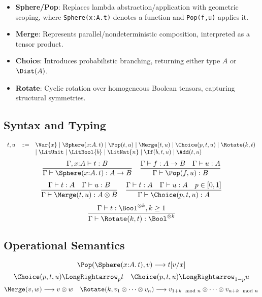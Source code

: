 \documentclass{article}
\begin{document}
\begin{itemize}
    \item \textbf{Sphere/Pop}: Replaces lambda abstraction/application with geometric scoping, where \texttt{Sphere(x:A.t)} denotes a function and \texttt{Pop(f,u)} applies it.
    \item \textbf{Merge}: Represents parallel/nondeterministic composition, interpreted as a tensor product.
    \item \textbf{Choice}: Introduces probabilistic branching, returning either type $A$ or $\Dist(A)$.
    \item \textbf{Rotate}: Cyclic rotation over homogeneous Boolean tensors, capturing structural symmetries.
\end{itemize}

\subsection{Syntax and Typing}
\[
\begin{array}{rcl}
t,u &::=& \Var{x} \mid \Sphere(x{:}A.\,t) \mid \Pop(t,u) \mid \Merge(t,u) \mid \Choice(p,t,u) \mid \Rotate(k,t) \\
    && \mid \LitUnit \mid \LitBool{b} \mid \LitNat{n} \mid \If(b,t,u) \mid \Add(t,u)
\end{array}
\]
\[
\frac{\Gamma, x{:}A \vdash t : B}{\Gamma \vdash \Sphere(x{:}A.\,t) : A \to B} \quad
\frac{\Gamma \vdash f : A \to B \quad \Gamma \vdash u : A}{\Gamma \vdash \Pop(f,u) : B}
\]
\[
\frac{\Gamma \vdash t : A \quad \Gamma \vdash u : B}{\Gamma \vdash \Merge(t,u) : A \otimes B} \quad
\frac{\Gamma \vdash t : A \quad \Gamma \vdash u : A \quad p \in [0,1]}{\Gamma \vdash \Choice(p,t,u) : A}
\]
\[
\frac{\Gamma \vdash t : \Bool^{\otimes k}, k \ge 1}{\Gamma \vdash \Rotate(k,t) : \Bool^{\otimes k}}
\]

\subsection{Operational Semantics}
\[
\Pop(\Sphere(x{:}A.\,t), v) \longrightarrow t[v/x]
\]
\[
\Choice(p,t,u) \LongRightarrow_p t \quad \Choice(p,t,u) \LongRightarrow_{1-p} u
\]
\[
\Merge(v,w) \longrightarrow v \otimes w \quad \Rotate(k, v_1 \otimes \cdots \otimes v_n) \longrightarrow v_{1+k \mod n} \otimes \cdots \otimes v_{n+k \mod n}
\]
\end{document}
